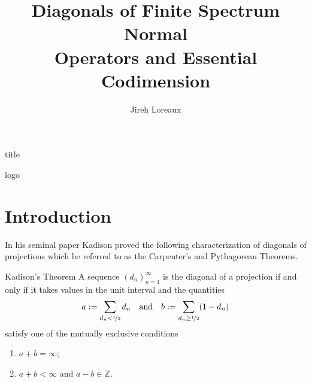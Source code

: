 \documentclass{article}
\begin{document}

\setmainfont{Linux Libertine}
\setsansfont{DejaVu Sans}
\LARGE\sffamily
{}


\begin{staticcontents*}{title}
  \title{Diagonals of Finite Spectrum Normal \\ Operators and Essential Codimension}
  \author{Jireh Loreaux}
  \maketitle
\end{staticcontents*}


\begin{staticcontents*}{logo}
\end{staticcontents*}


\section*{Introduction}

In his seminal paper \cite{Kad-2002-PNASUa} Kadison proved the following characterization of diagonals of projections which he referred to as the Carpenter's and Pythagorean Theorems.

\begin{thmcustom}{Kadison's Theorem}
  A sequence $(d_n)_{n=1}^{\infty}$ is the diagonal of a projection if and only if it takes values in the unit interval and the quantities
  \begin{equation*}
    a := \sum_{d_n < \nicefrac{1}{2}} d_n \quad\text{and}\quad b := \sum_{d_n \ge \nicefrac{1}{2}} (1-d_n)
  \end{equation*}
  satisfy one of the mutually exclusive conditions
  \begin{enumerate}
  \item $a+b = \infty$;
  \item $a+b < \infty$ and $a-b \in \mathbb{Z}$.
  \end{enumerate}
\end{thmcustom}
\end{document}
